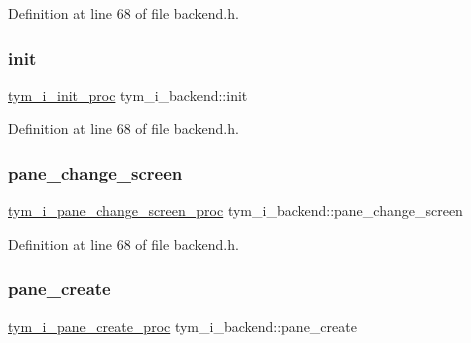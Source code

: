 Definition at line 68 of file backend.\+h.

\mbox{\label{structtym__i__backend_a9e5755b91dadb2460eb67423e126cf60}} 
\subsubsection{\texorpdfstring{init}{init}}
{\footnotesize\ttfamily \hyperlink{backend_8h_a1d8c83e098af07295e7c8c6aaff509f8}{tym\+\_\+i\+\_\+init\+\_\+proc} tym\+\_\+i\+\_\+backend\+::init}



Definition at line 68 of file backend.\+h.

\mbox{\label{structtym__i__backend_a75f72684565b37e6ca66f5f71260931b}} 
\subsubsection{\texorpdfstring{pane\+\_\+change\+\_\+screen}{pane\_change\_screen}}
{\footnotesize\ttfamily \hyperlink{backend_8h_a069b99db5129d301726cec915fea32a8}{tym\+\_\+i\+\_\+pane\+\_\+change\+\_\+screen\+\_\+proc} tym\+\_\+i\+\_\+backend\+::pane\+\_\+change\+\_\+screen}



Definition at line 68 of file backend.\+h.

\mbox{\label{structtym__i__backend_ac09a0c208115068effc8a0de70136c63}} 
\subsubsection{\texorpdfstring{pane\+\_\+create}{pane\_create}}
{\footnotesize\ttfamily \hyperlink{backend_8h_ab44c405291766aa8377ccabbf142c682}{tym\+\_\+i\+\_\+pane\+\_\+create\+\_\+proc} tym\+\_\+i\+\_\+backend\+::pane\+\_\+create}



